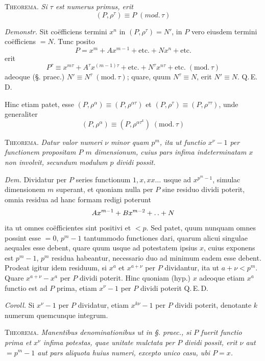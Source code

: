 \textsc{Theorema.} \emph{Si $\tau$ est numerus primus, erit}
\[
(P,\rho^\tau)\equiv P\;(\mathit{mod.}\,\tau)
\]

\emph{Demonstr.} Sit coëfficiens termini $x^n$ in $(P,\rho^\tau)=N'$, in $P$ vero eiusdem termini coëfficiens $=N$. Tunc posito
\[
P=x^m+Ax^{m-1}+\text{etc.}+Nx^n+\text{etc.}
\]
erit
\[
P^\tau\equiv x^{m\tau}+A^\tau x^{(m-1)\tau}+\text{etc.}+N^\tau x^{n\tau}+\text{etc.}\;(\mathrm{mod.}\,\tau)
\]
adeoque (§. praec.) $N'\equiv N^\tau\;(\mathrm{mod.}\,\tau)$; quare, quum $N^\tau\equiv N$, erit $N'\equiv N$. Q.\,E.\,D.

Hinc etiam patet, esse $(P,\rho^\alpha)\equiv(P,\rho^{\alpha\tau})$ et $(P,\rho^\tau)\equiv(P,\rho^{\tau\tau})$, unde generaliter
\[
(P,\rho^\alpha)\equiv(P,\rho^{\alpha\tau^k})\;(\mathrm{mod.}\,\tau)
\]

%
\textsc{Theorema.} \emph{Datur valor numeri $\nu$ minor quam $p^m$, ita ut functio $x^\nu-1$ per functionem propositam $P$ $m$ dimensionum, cuius pars infima indeterminatam $x$ non involvit, secundum modulum $p$ dividi possit.}

\emph{Dem.} Dividatur per $P$ series functionum $1,x,xx\ldots$ usque ad $x^{p^m-1}$, simulac dimensionem $m$ superant, et quoniam nulla per $P$ sine residuo dividi poterit, omnia residua ad hanc formam redigi poterunt
\[
Ax^{m-1}+Bx^{m-2}+\mathinner{.\,.}+N
\]
ita ut omnes coëfficientes sint positivi et $<p$. Sed patet, quum nunquam omnes possint esse $=0$, $p^m-1$ tantummodo functiones dari, quarum alicui singulae aequales esse debent, quare quum usque ad potestatem ipsius $x$, cuius exponens est $p^m-1$, $p^m$ residua habeantur, necessario duo ad minimum eadem esse debent. Prodeat igitur idem residuum, si $x^a$ et $x^{a+\nu}$ per $P$ dividantur, ita ut $a+\nu<p^m$. Quare $x^{a+\nu}-x^a$ per $P$ dividi poterit. Hinc quoniam (hyp.) $x$ adeoque etiam $x^a$ functio est ad $P$ prima, etiam $x^\nu-1$ per $P$ dividi poterit Q.\,E.\,D.

\emph{Coroll.} Si $x^\nu-1$ per $P$ dividatur, etiam $x^{k\nu}-1$ per $P$ dividi poterit, denotante $k$ numerum quemcunque integrum.

\textsc{Theorema.} \emph{Manentibus denominationibus ut in §. praec., si $P$ fuerit functio prima et $x^\nu$ infima potestas, quae unitate mulctata per $P$ dividi possit, erit $\nu$ aut $=p^m-1$ aut pars aliquota huius numeri, excepto unico casu, ubi $P=x$.}

